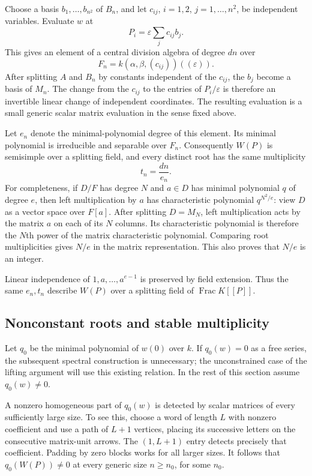 \documentclass[11pt]{article}
\theoremstyle{definition}
\theoremstyle{remark}
\numberwithin{equation}{section}
\begin{document}
Choose a basis $b_1,\ldots,b_{n^2}$ of $B_n$, and let
$c_{ij}$, $i=1,2$, $j=1,\ldots,n^2$, be independent variables.
Evaluate $w$ at
\[
 P_i=\varepsilon\sum_j c_{ij}b_j.
\]
This gives an element of a central division algebra of degree $dn$
over
\[
 F_n=k(\alpha,\beta,(c_{ij}))((\varepsilon)).
\]
After splitting $A$ and $B_n$ by constants independent of the $c_{ij}$,
the $b_j$ become a basis of $M_n$.  The change from the $c_{ij}$ to
the entries of $P_i/\varepsilon$ is therefore an invertible linear
change of independent coordinates.  The resulting evaluation is a
small generic scalar matrix evaluation in the sense fixed above.

Let $e_n$ denote the minimal-polynomial degree of this element.  Its
minimal polynomial is irreducible and separable over $F_n$.
Consequently $W(P)$ is semisimple over a splitting field, and every
distinct root has the same multiplicity
\begin{equation}
t_n=\frac{dn}{e_n}.
 \label{eq:generic-multiplicity}
\end{equation}
For completeness, if $D/F$ has degree $N$ and $a\in D$ has minimal
polynomial $q$ of degree $e$, then left multiplication by $a$ has
characteristic polynomial $q^{N^2/e}$: view $D$ as a vector space
over $F[a]$.  After splitting $D=M_N$, left multiplication acts by
the matrix $a$ on each of its $N$ columns.  Its characteristic
polynomial is therefore the $N$th power of the matrix characteristic
polynomial.  Comparing root multiplicities gives $N/e$ in the
matrix representation.  This also proves that $N/e$ is an integer.

Linear independence of $1,a,\ldots,a^{e-1}$ is preserved by field
extension.  Thus the same $e_n,t_n$ describe $W(P)$ over a splitting
field of $\operatorname{Frac}K[[P]]$.

\subsection{Nonconstant roots and stable multiplicity}
\label{subsec:stable-multiplicity}

Let $q_0$ be the minimal polynomial of $w(0)$ over $k$.  If
$q_0(w)=0$ as a free series, the subsequent spectral construction is
unnecessary; the unconstrained case of the lifting argument will use
this existing relation.  In the rest of this section assume
$q_0(w)\ne0$.

A nonzero homogeneous part of $q_0(w)$ is detected by scalar matrices
of every sufficiently large size.  To see this, choose a word of
length $L$ with nonzero coefficient and use a path of $L+1$ vertices,
placing its successive letters on the consecutive matrix-unit
arrows.  The $(1,L+1)$ entry detects precisely that coefficient.
Padding by zero blocks works for all larger sizes.  It follows that
$q_0(W(P))\ne0$ at every generic size $n\ge n_0$, for some $n_0$.
\end{document}
